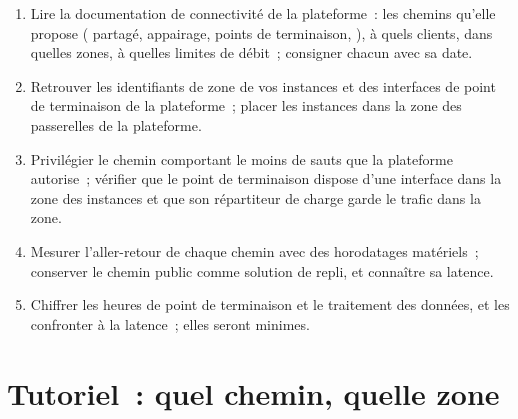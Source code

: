 \begin{method}\label{met:nw:private-connectivity-to-crypto-venues:connect}
\begin{enumerate}
\item Lire la documentation de connectivité de la plateforme~: les chemins qu'elle propose ( partagé, appairage, points de terminaison, ), à quels clients, dans quelles
  zones, à quelles limites de débit~; consigner chacun avec sa date.
\item Retrouver les identifiants de zone de vos instances et des interfaces de point de terminaison de la plateforme~; placer les instances dans la zone des passerelles de la plateforme.
\item Privilégier le chemin comportant le moins de sauts que la plateforme autorise~; vérifier que le point de terminaison dispose d'une interface dans la zone des instances et que son répartiteur de charge garde
  le trafic dans la zone.
\item Mesurer l'aller-retour de chaque chemin avec des horodatages matériels~; conserver le chemin public comme solution de repli, et connaître sa latence.
\item Chiffrer les heures de point de terminaison et le traitement des données, et les confronter à la latence~; elles seront minimes.
\end{enumerate}
\end{method}

\section{Tutoriel~: quel chemin, quelle zone}\label{tut:nw:private-connectivity-to-crypto-venues:tut}

